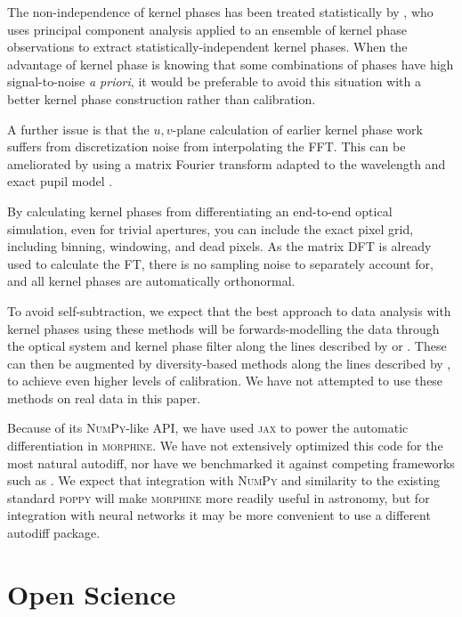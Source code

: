 \documentclass[modern]{aastex63}
\begin{document}
The non-independence of kernel phases has been treated statistically by \citet{ireland13}, who uses principal component analysis applied to an ensemble of kernel phase observations to extract statistically-independent kernel phases. When the advantage of kernel phase is knowing that some combinations of phases have high signal-to-noise \textit{a priori}, it would be preferable to avoid this situation with a better kernel phase construction rather than calibration.

A further issue is that the $u,v$-plane calculation of earlier kernel phase work suffers from discretization noise from interpolating the FFT. This can be ameliorated by using a matrix Fourier transform adapted to the wavelength and exact pupil model \citep{martinache_habilitation}.

By calculating kernel phases from differentiating an end-to-end optical simulation, even for trivial apertures, you can include the exact pixel grid, including binning, windowing, and dead pixels. As the matrix DFT is already used to calculate the FT, there is no sampling noise to separately account for, and all kernel phases are automatically orthonormal.

To avoid self-subtraction, we expect that the best approach to data analysis with kernel phases using these methods will be forwards-modelling the data through the optical system and kernel phase filter along the lines described by \citet{pueyo16} or \citet{martinache20}. These can then be augmented by diversity-based methods along the lines described by \citet{ireland13}, to achieve even higher levels of calibration. We have not attempted to use these methods on real data in this paper.

Because of its \textsc{NumPy}-like API, we have used \textsc{jax} to power the automatic differentiation in \textsc{morphine}. We have not extensively optimized this code for the most natural autodiff, nor have we benchmarked it against competing frameworks such as . We expect that integration with \textsc{NumPy} and similarity to the existing standard \textsc{poppy} will make \textsc{morphine} more readily useful in astronomy, but for integration with neural networks it may be more convenient to use a different autodiff package. 

\section{Open Science}
\label{sec:open}
\end{document}
